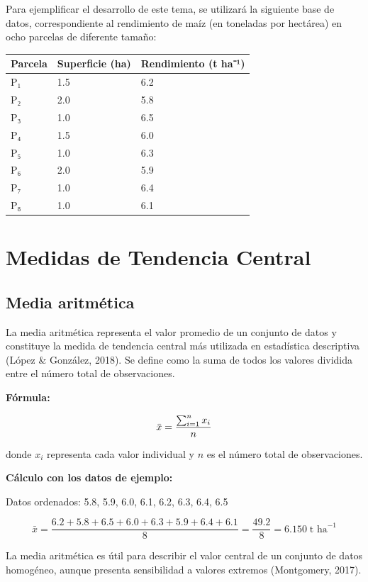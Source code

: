 \documentclass[
  spanish,
  letterpaper,
]{book}
\begin{document}
Para ejemplificar el desarrollo de este tema, se utilizará la siguiente
base de datos, correspondiente al rendimiento de maíz (en toneladas por
hectárea) en ocho parcelas de diferente tamaño:

\begin{longtable}[]{@{}lll@{}}
\toprule\noalign{}
Parcela & Superficie (ha) & Rendimiento (t ha⁻¹) \\
\midrule\noalign{}
\endhead
\bottomrule\noalign{}
\endlastfoot
P₁ & 1.5 & 6.2 \\
P₂ & 2.0 & 5.8 \\
P₃ & 1.0 & 6.5 \\
P₄ & 1.5 & 6.0 \\
P₅ & 1.0 & 6.3 \\
P₆ & 2.0 & 5.9 \\
P₇ & 1.0 & 6.4 \\
P₈ & 1.0 & 6.1 \\
\end{longtable}

\section{Medidas de Tendencia
Central}\label{medidas-de-tendencia-central}

\subsection{Media aritmética}\label{media-aritmuxe9tica}

La media aritmética representa el valor promedio de un conjunto de datos
y constituye la medida de tendencia central más utilizada en estadística
descriptiva (López \& González, 2018). Se define como la suma de todos
los valores dividida entre el número total de observaciones.

\textbf{Fórmula:}

\[\huge \bar{x} = \frac{\sum_{i=1}^{n} x_i}{n}\]

donde \(x_i\) representa cada valor individual y \(n\) es el número
total de observaciones.

\textbf{Cálculo con los datos de ejemplo:}

Datos ordenados: 5.8, 5.9, 6.0, 6.1, 6.2, 6.3, 6.4, 6.5

\[\bar{x} = \frac{6.2 + 5.8 + 6.5 + 6.0 + 6.3 + 5.9 + 6.4 + 6.1}{8} = \frac{49.2}{8} = 6.150\; \text{t ha}^{-1}\]

La media aritmética es útil para describir el valor central de un
conjunto de datos homogéneo, aunque presenta sensibilidad a valores
extremos (Montgomery, 2017).
\end{document}

